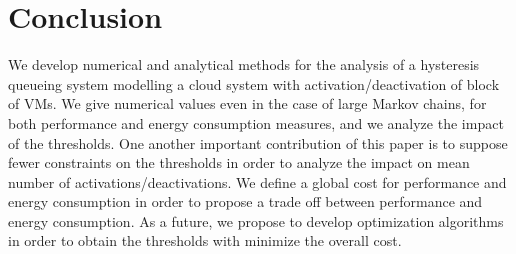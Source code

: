 \documentclass[conference]{IEEEtran}
\begin{document}
%
%

\section{Conclusion}

We develop numerical and analytical methods for the analysis of a hysteresis queueing system modelling a cloud system with activation/deactivation of block of VMs. 
We give numerical values even in the case of large Markov chains, for both performance and energy consumption measures, and we analyze the impact of the thresholds.  One another important contribution of this paper  is to suppose fewer constraints on the thresholds in order to analyze the impact on  mean number of activations/deactivations.
We define a
global cost for performance and energy consumption in order to propose  a trade off between performance and energy consumption.
As a future,  we propose to develop optimization algorithms in order to obtain the thresholds with minimize
the overall cost.
\end{document}
